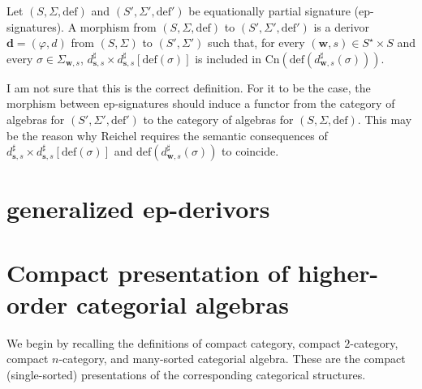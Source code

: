 \documentclass{amsart}
\theoremstyle{plain}
\theoremstyle{definition}
\begin{document}
Let $(S,\Sigma,\mathrm{def})$ and $(S',\Sigma',\mathrm{def}')$ be  equationally partial signature (ep-signatures). A morphism from $(S,\Sigma,\mathrm{def})$ to $(S',\Sigma',\mathrm{def}')$ is a derivor $\mathbf{d} = (\varphi,d)$ from $(S,\Sigma)$ to $(S',\Sigma')$ such that, for every 
$(\mathbf{w},s)\in S^{\star}\times S$ and every $\sigma\in \Sigma_{\mathbf{w},s}$, 
$d_{\mathbf{s},s}^{\sharp}\times d_{\mathbf{s},s}^{\sharp}[\mathrm{def}(\sigma)]$ is included in 
$\mathrm{Cn}(\mathrm{def}(d_{\mathbf{w},s}^{\sharp}(\sigma)))$.

I am not sure that this is the correct definition. For it to be the case, the morphism between ep-signatures should induce a functor from the category of algebras for $(S',\Sigma',\mathrm{def}')$ to the category of algebras for $(S,\Sigma,\mathrm{def})$. This may be the reason why Reichel requires the semantic consequences of $d_{\mathbf{s},s}^{\sharp}\times d_{\mathbf{s},s}^{\sharp}[\mathrm{def}(\sigma)]$ and $\mathrm{def}(d_{\mathbf{w},s}^{\sharp}(\sigma))$ to coincide.

\section{generalized ep-derivors}

\section{Compact presentation of higher-order categorial algebras}\label{SCompact}

We begin by recalling the definitions of compact category, compact $2$-category, compact $n$-category, and many-sorted categorial algebra. These are the compact (single-sorted) presentations of the corresponding categorical structures.
\end{document}
